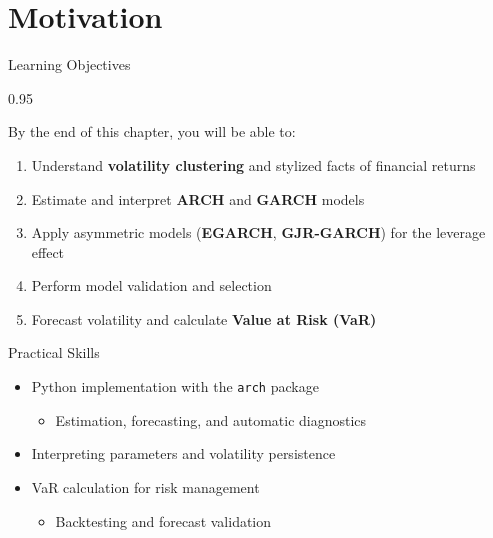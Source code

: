 \documentclass[9pt, aspectratio=169, t]{beamer}
\subtitle{Chapter 5: GARCH and Volatility}
\begin{document}
{
\begin{frame}
    \titlepage
\end{frame}
}

\section{Motivation}

\begin{frame}{Learning Objectives}
    \begin{cminipage}{0.95\textwidth}
\begin{block}{By the end of this chapter, you will be able to:}
\begin{enumerate}\setlength{\itemsep}{0pt}
    \item Understand \textbf{volatility clustering} and stylized facts of financial returns
    \item Estimate and interpret \textbf{ARCH} and \textbf{GARCH} models
    \item Apply asymmetric models (\textbf{EGARCH}, \textbf{GJR-GARCH}) for the leverage effect
    \item Perform model validation and selection
    \item Forecast volatility and calculate \textbf{Value at Risk (VaR)}
\end{enumerate}
\end{block}
\vspace{-0.1cm}
\begin{alertblock}{Practical Skills}
    \begin{itemize}\setlength{\itemsep}{0pt}
        \item Python implementation with the \texttt{arch} package
            \begin{itemize}\setlength{\itemsep}{0pt}
                \item Estimation, forecasting, and automatic diagnostics
            \end{itemize}
        \item Interpreting parameters and volatility persistence
        \item VaR calculation for risk management
            \begin{itemize}\setlength{\itemsep}{0pt}
                \item Backtesting and forecast validation
            \end{itemize}
    \end{itemize}
\end{alertblock}
    \end{cminipage}
\end{frame}
\end{document}
